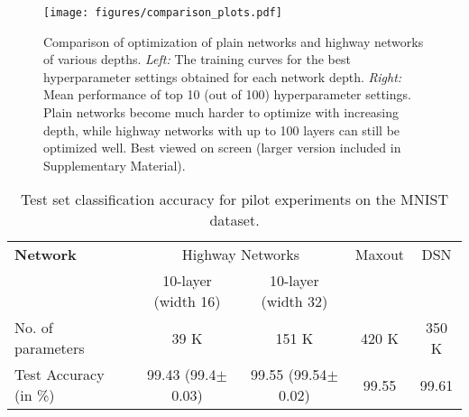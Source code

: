\documentclass{article}
\begin{document}
\begin{figure*}[t]
\texttt{[image: figures/comparison\_plots.pdf]}
\caption{Comparison of optimization of plain networks and highway networks of various depths. \textit{Left:} The training curves for the best hyperparameter settings obtained for each network depth. \textit{Right:} Mean performance of top 10 (out of 100) hyperparameter settings. Plain networks become much harder to optimize with increasing depth, while highway networks with up to 100 layers can still be optimized well. Best viewed on screen (larger version included in Supplementary Material).}
\label{fig:mnist-convergence}
\end{figure*}


\begin{table*}
	\centering
    \begin{tabular}{lcccc}
    \hline
    \textbf{Network}   & \multicolumn{2}{c}{Highway Networks} & Maxout \cite{Goodfellow2013} & DSN \cite{Lee2015} \\
              & 10-layer (width 16) & 10-layer (width 32) & & \\
    \hline
    No. of parameters & 39 K & 151 K & 420 K & 350 K\\
    Test Accuracy (in \%) & 99.43 (99.4$\pm$0.03) & 99.55 (99.54$\pm$0.02) & 99.55 & 99.61 \\
    \hline
    \end{tabular}
    \caption{Test set classification accuracy for pilot experiments on the MNIST dataset.}
    \label{tab:mnist-results}
\end{table*}
\end{document}
